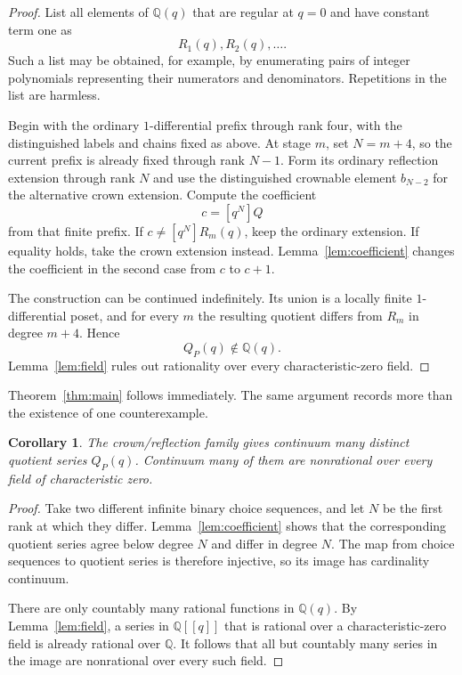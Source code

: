 \documentclass[11pt]{amsart}
\newtheorem{corollary}[theorem]{Corollary}
\theoremstyle{remark}
\newcommand{\Q}{\mathbb{Q}}
\begin{document}
\begin{proof}
List all elements of $\Q(q)$ that are regular at $q=0$ and have constant term one as
\[
R_1(q),R_2(q),\ldots.
\]
Such a list may be obtained, for example, by enumerating pairs of integer polynomials representing their numerators and denominators. Repetitions in the list are harmless.

Begin with the ordinary $1$-differential prefix through rank four, with the distinguished labels and chains fixed as above. At stage $m$, set $N=m+4$, so the current prefix is already fixed through rank $N-1$. Form its ordinary reflection extension through rank $N$ and use the distinguished crownable element $b_{N-2}$ for the alternative crown extension. Compute the coefficient
\[
c=[q^N]Q
\]
from that finite prefix. If $c\neq[q^N]R_m(q)$, keep the ordinary extension. If equality holds, take the crown extension instead. Lemma~\ref{lem:coefficient} changes the coefficient in the second case from $c$ to $c+1$.

The construction can be continued indefinitely. Its union is a locally finite $1$-differential poset, and for every $m$ the resulting quotient differs from $R_m$ in degree $m+4$. Hence
\[
Q_P(q)\notin\Q(q).
\]
Lemma~\ref{lem:field} rules out rationality over every characteristic-zero field.
\end{proof}

Theorem~\ref{thm:main} follows immediately. The same argument records more than the existence of one counterexample.

\begin{corollary}\label{cor:continuum}
The crown/reflection family gives continuum many distinct quotient series $Q_P(q)$. Continuum many of them are nonrational over every field of characteristic zero.
\end{corollary}

\begin{proof}
Take two different infinite binary choice sequences, and let $N$ be the first rank at which they differ. Lemma~\ref{lem:coefficient} shows that the corresponding quotient series agree below degree $N$ and differ in degree $N$. The map from choice sequences to quotient series is therefore injective, so its image has cardinality continuum.

There are only countably many rational functions in $\Q(q)$. By Lemma~\ref{lem:field}, a series in $\Q[[q]]$ that is rational over a characteristic-zero field is already rational over $\Q$. It follows that all but countably many series in the image are nonrational over every such field.
\end{proof}
\end{document}
